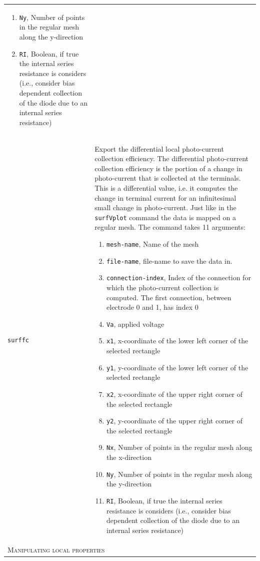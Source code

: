 \documentclass[noshowpacs,preprintnumbers,amsmath,amssymb, letter]{revtex4}
\begin{document}
\begin{longtable}{p{}p{}}
\begin{enumerate}
\item \texttt{Ny}, Number of points in the regular mesh along the y-direction
\item \texttt{RI}, Boolean, if true the internal series resistance is considers (i.e., consider bias dependent collection of the diode due to an internal series resistance)
\end{enumerate}\\
\texttt{surffc}		& Export the differential local photo-current collection efficiency. The differential photo-current collection efficiency is the portion of a change in photo-current that is collected at the terminals. This is a differential value, i.e. it computes the change in terminal current for an infinitesimal small change in photo-current. Just like in the \texttt{surfVplot} command the data is mapped on a regular mesh. The command takes 11 arguments:
\begin{enumerate}
\item \texttt{mesh-name}, Name of the mesh
\item \texttt{file-name}, file-name to save the data in.
\item \texttt{connection-index}, Index of the connection for which the photo-current collection is computed. The first connection, between electrode 0 and 1,  has index 0
\item \texttt{Va}, applied voltage
\item \texttt{x1}, x-coordinate of the lower left corner of the selected rectangle
\item \texttt{y1}, y-coordinate of the lower left corner of the selected rectangle
\item \texttt{x2}, x-coordinate of the upper right corner of the selected rectangle
\item \texttt{y2}, y-coordinate of the upper right corner of the selected rectangle
\item \texttt{Nx}, Number of points in the regular mesh along the x-direction
\item \texttt{Ny}, Number of points in the regular mesh along the y-direction
\item \texttt{RI}, Boolean, if true the internal series resistance is considers (i.e., consider bias dependent collection of the diode due to an internal series resistance)
\end{enumerate}\\
\multicolumn{2}{l}{\textsc{Manipulating local properties}} \\*

\end{longtable}
\end{document}
